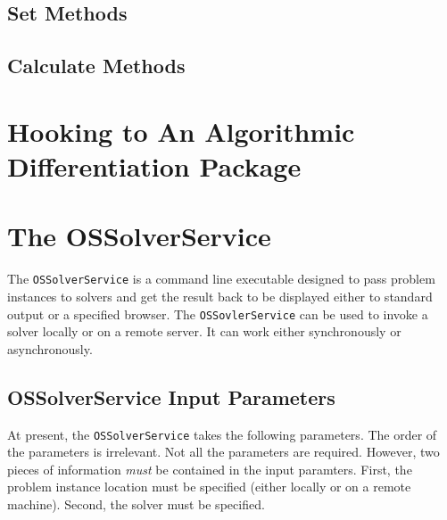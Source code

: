 \documentclass[12pt]{article}
\renewcommand{\_}{{\char"5F}}
\renewcommand{\{}{{\char"7B}}
\renewcommand{\}}{{\char"7D}}
\renewcommand{\^}{{\char"0D}}
\renewcommand{\'}{{\char"0D}}
\begin{document}
\subsection{Set Methods}

\subsection{Calculate Methods}

\section{Hooking to An Algorithmic Differentiation Package}

\section{The OSSolverService}

The {\tt OSSolverService} is a command line executable designed to pass problem instances to solvers and get the result back to be displayed either to standard output or a specified browser.  The {\tt OSSovlerService} can be used to invoke a solver locally or on a remote server. It can work either synchronously or asynchronously. 

\subsection{OSSolverService Input Parameters}

At present, the {\tt OSSolverService} takes the following parameters. The order of the parameters is irrelevant.  Not all the parameters are required. However, two pieces of information {\it must} be contained in the input paramters.  First,  the problem instance location must be specified (either locally or on a remote machine). Second, the solver must be specified. 
\end{document}
